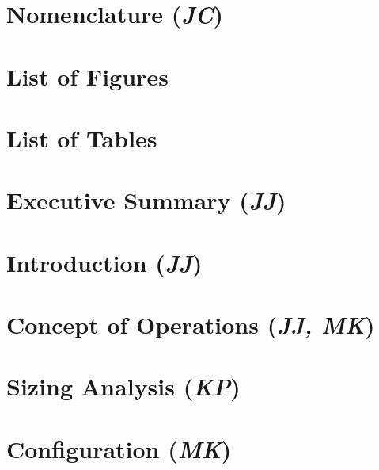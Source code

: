 \documentclass[conf]{new-aiaa}
\begin{document}
\newpage

\renewcommand{\thesection}{\arabic{section}}

\section{Nomenclature (\textit{JC})}


\clearpage

\section{List of Figures}
\makeatletter
{}%
\makeatother

\section{List of Tables}
\makeatletter
{}%
\makeatother

\newpage
\doublespacing


\section{Executive Summary (\textit{JJ})}
\label{section: Exec Summary}


\clearpage
\setcounter{section}{0}
\renewcommand{\thesection}{\Roman{section}}

\section{Introduction (\textit{JJ})}
\label{section: Intro}


\section{Concept of Operations (\textit{JJ, MK})}
\label{section: Conops}


\clearpage
\section{Sizing Analysis (\textit{KP})}
\label{section: Sizing Analysis}


\section{Configuration (\textit{MK})}
\label{section: Configuration}

\end{document}
